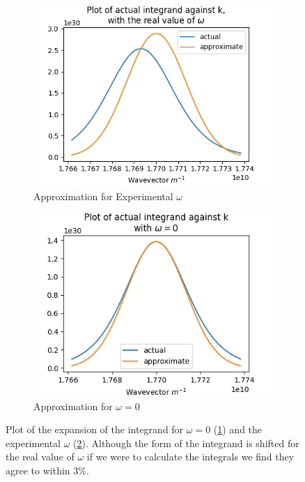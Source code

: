 \begin{figure}[htbp]
    \centering
    \begin{subfigure}{0.45\linewidth}
        \centering
        \includegraphics[width =0.9 \linewidth]{Figures/Redfield/real omega fermi k expansion.png}
        \caption{Approximation for Experimental \(\omega \)
        }\label{sub@fig:omega zero expansion}
    \end{subfigure}
    \begin{subfigure}{0.45\linewidth}
        \centering
        \includegraphics[width = 0.9\linewidth]{Figures/Redfield/zero omega fermi k expansion.png}
        \caption{Approximation for \(\omega = 0\)
        }\label{sub@fig:omega not zero expansion}
    \end{subfigure}
    \caption{
        Plot of the expansion of
        the integrand for \(\omega = 0\)
        (\cref{sub@fig:omega zero expansion})
        and the experimental \(\omega \)
        (\cref{sub@fig:omega not zero expansion}).
        Although the form of the
        integrand is shifted for the
        real value of \(\omega \)
        if we were to calculate
        the integrals we find
        they agree
        to within \(3\% \).
    }\label{fig:expansion about kf}
\end{figure}
